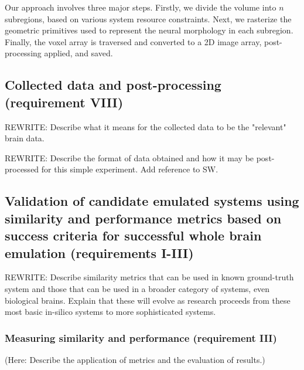 \documentclass{ldr-article}
\begin{document}
Our approach involves three major steps. Firstly, we divide the volume into $n$ subregions, based on various system resource constraints. Next, we rasterize the geometric primitives used to represent the neural morphology in each subregion. Finally, the voxel array is traversed and converted to a 2D image array, post-processing applied, and saved.




\subsection{Collected data and post-processing (requirement VIII)}

\alert{REWRITE:} Describe what it means for the collected data to be the "relevant" brain data.

\alert{REWRITE:} Describe the format of data obtained and how it may be post-processed for this simple experiment. Add reference to SW.

\subsection{Validation of candidate emulated systems using similarity and performance metrics based on success criteria for successful whole brain emulation (requirements I-III)}

\alert{REWRITE:} Describe similarity metrics that can be used in known ground-truth system and those that can be used in a broader category of systems, even biological brains. Explain that these will evolve as research proceeds from these most basic in-silico systems to more sophisticated systems.

\subsubsection{Measuring similarity and performance (requirement III)}

(Here: Describe the application of metrics and the evaluation of results.)
\end{document}

